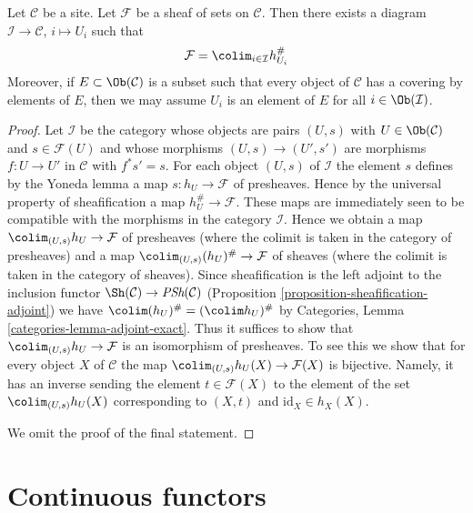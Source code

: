 \begin{lemma}
\label{lemma-colimit-representable}
Let $\mathcal{C}$ be a site. Let $\mathcal{F}$ be a sheaf of sets on
$\mathcal{C}$. Then there exists a diagram $\mathcal{I} \to \mathcal{C}$,
$i \mapsto U_i$ such that
$$
\mathcal{F} = \colim_{i \in \mathcal{I}} h_{U_i}^\#
$$
Moreover, if $E \subset \Ob(\mathcal{C})$ is a subset such that every
object of $\mathcal{C}$ has a covering by elements of $E$, then we may
assume $U_i$ is an element of $E$ for all $i \in \Ob(\mathcal{I})$.
\end{lemma}

\begin{proof}
Let $\mathcal{I}$ be the category whose objects are pairs
$(U, s)$ with $U \in \Ob(\mathcal{C})$ and $s \in \mathcal{F}(U)$
and whose morphisms $(U, s) \to (U', s')$ are morphisms $f : U \to U'$
in $\mathcal{C}$ with $f^*s' = s$. For each object $(U, s)$ of $\mathcal{I}$
the element $s$ defines by the Yoneda lemma a map $s : h_U \to \mathcal{F}$
of presheaves. Hence by the universal property of sheafification a map
$h_U^\# \to \mathcal{F}$. These maps are immediately seen to be compatible
with the morphisms in the category $\mathcal{I}$. Hence we obtain
a map $\colim_{(U, s)} h_U \to \mathcal{F}$ of presheaves (where the
colimit is taken in the category of presheaves) and a map
$\colim_{(U, s)} (h_U)^\# \to \mathcal{F}$ of sheaves (where the
colimit is taken in the category of sheaves).
Since sheafification is the left adjoint to the inclusion functor
$\Sh(\mathcal{C}) \to \textit{PSh}(\mathcal{C})$
(Proposition \ref{proposition-sheafification-adjoint}) we have
$\colim (h_U)^\# = (\colim h_U)^\#$ by
Categories, Lemma \ref{categories-lemma-adjoint-exact}.
Thus it suffices to show that $\colim_{(U, s)} h_U \to \mathcal{F}$
is an isomorphism of presheaves. To see this we show that for every object
$X$ of $\mathcal{C}$ the map $\colim_{(U, s)} h_U(X) \to \mathcal{F}(X)$
is bijective. Namely, it has an inverse sending the element
$t \in \mathcal{F}(X)$ to the element of the set $\colim_{(U, s)} h_U(X)$
corresponding to $(X, t)$ and $\text{id}_X \in h_X(X)$.

\medskip\noindent
We omit the proof of the final statement.
\end{proof}




\section{Continuous functors}
\label{section-continuous-functors}

